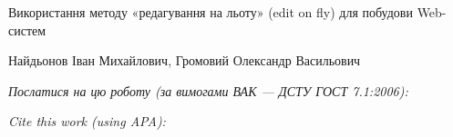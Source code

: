 \documentclass[a4paper,14pt]{extarticle}
\newcommand{\articleTitleUkr}{
Використання методу «редагування на льоту» (edit on fly) для побудови Web-систем}
\newcommand{\authorFullNameUkr}{Найдьонов Іван Михайлович, Громовий Олександр Васильович}
\begin{document}
\begin{center}\bf
\par\MakeUppercase\articleTitleUkr
\par\authorFullNameUkr
\end{center}

\par\bigskip\textit{Послатися на цю роботу (за вимогами ВАК --- ДСТУ ГОСТ 7.1:2006):}
\par{}
\par\bigskip\textit{Cite this work (using APA):}
\par{}

\end{document}
